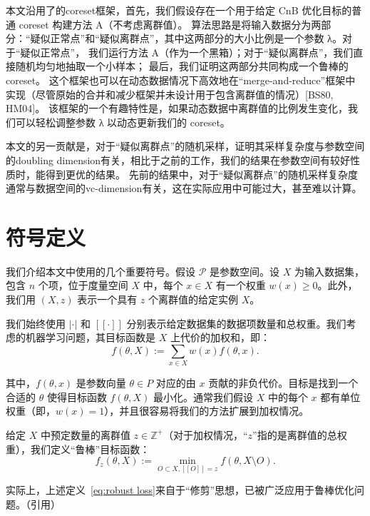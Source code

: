 本文沿用了\citet{Wang2021RobustAF}的coreset框架，首先，我们假设存在一个用于给定 CnB 优化目标的普通 coreset 构建方法 A（不考虑离群值）。
算法思路是将输入数据分为两部分：“疑似正常点”和“疑似离群点”，其中这两部分的大小比例是一个参数 λ。对于“疑似正常点”，
我们运行方法 A（作为一个黑箱）；对于“疑似离群点”，我们直接随机均匀地抽取一个小样本；
最后，我们证明这两部分共同构成一个鲁棒的 coreset。
这个框架也可以在动态数据情况下高效地在“merge-and-reduce”框架中实现（尽管原始的合并和减少框架并未设计用于包含离群值的情况）[BS80, HM04]。
该框架的一个有趣特性是，如果动态数据中离群值的比例发生变化，我们可以轻松调整参数 λ 以动态更新我们的 coreset。

本文的另一贡献是，对于“疑似离群点”的随机采样，证明其采样复杂度与参数空间的doubling dimension有关，相比于之前的工作，我们的结果在参数空间有较好性质时，能得到更优的结果。
先前的结果中，对于“疑似离群点”的随机采样复杂度通常与数据空间的vc-dimension有关，这在实际应用中可能过大，甚至难以计算。




\section{符号定义}


我们介绍本文中使用的几个重要符号。假设 $\mathcal{P}$ 是参数空间。设 $X$ 为输入数据集，包含 $n$ 个项，位于度量空间 $X$ 中，每个 $x \in X$ 有一个权重 $w(x) \geq 0$。此外，我们用 $(X, z)$ 表示一个具有 $z$ 个离群值的给定实例 $X$。

我们始终使用 $| \cdot |$ 和 $[[ \cdot ]]$ 分别表示给定数据集的数据项数量和总权重。我们考虑的机器学习问题，其目标函数是 $X$ 上代价的加权和，即：
\begin{equation}
f(\theta, X) := \sum_{x \in X} w(x) f(\theta, x).
\label{eq:loss}
\end{equation}

其中，$f(\theta, x)$ 是参数向量 $\theta \in P$ 对应的由 $x$ 贡献的非负代价。目标是找到一个合适的 $\theta$ 使得目标函数 $f(\theta, X)$ 最小化。通常我们假设 $X$ 中的每个 $x$ 都有单位权重（即，$w(x) = 1$），并且很容易将我们的方法扩展到加权情况。

给定 $X$ 中预定数量的离群值 $z \in \mathbb{Z}^+$（对于加权情况，“$z$”指的是离群值的总权重），我们定义“鲁棒”目标函数：
\begin{equation}
f_z(\theta, X) := \min_{O \subset X, [[O]] = z} f(\theta, X \setminus O).
\label{eq:robust loss}
\end{equation}

实际上，上述定义~\eqref{eq:robust loss}来自于“修剪”思想，已被广泛应用于鲁棒优化问题。（引用）

